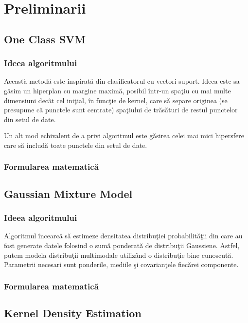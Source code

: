 \chapter{Preliminarii}

\section{One Class SVM}

\subsection{Ideea algoritmului}

Această metodă este inspirată din clasificatorul cu vectori suport. Ideea este 
sa găsim un hiperplan cu margine maximă, posibil într-un spaţiu cu 
mai multe dimensiuni decât cel iniţial, în funcţie de kernel,
care să separe originea (se presupune că punctele sunt centrate) spaţiului de trăsături
de restul punctelor din setul de date\cite{Schölkopf et al}.

Un alt mod echivalent de a privi algoritmul este găsirea celei mai mici 
hipersfere care să includă toate punctele din setul de date\cite{Tax et al.}.

\subsection{Formularea matematică}

\section{Gaussian Mixture Model}

\subsection{Ideea algoritmului}

Algoritmul încearcă să estimeze densitatea distribuţiei probabilităţii 
din care au fost generate datele folosind o sumă ponderată de distribuţii Gaussiene.
Astfel, putem modela distribuţii multimodale utilizând o distribuţie bine cunoscută.
Parametrii necesari sunt ponderile, mediile şi covarianţele fiecărei componente.

\subsection{Formularea matematică}

\section{Kernel Density Estimation}

